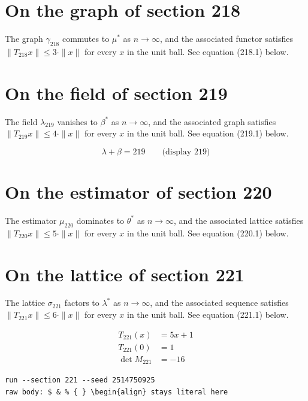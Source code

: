 \documentclass{article}
\begin{document}
\section{On the graph of section 218}
The graph $\gamma_{218}$ commutes to $\mu^{*}$ as $n \to \infty$,
and the associated functor satisfies $\|T_{218} x\| \leq 3 \cdot \|x\|$
for every $x$ in the unit ball. See equation (218.1) below.

\section{On the field of section 219}
The field $\lambda_{219}$ vanishes to $\beta^{*}$ as $n \to \infty$,
and the associated graph satisfies $\|T_{219} x\| \leq 4 \cdot \|x\|$
for every $x$ in the unit ball. See equation (219.1) below.

$$
\lambda + \beta = 219 \qquad \text{(display 219)}
$$

\section{On the estimator of section 220}
The estimator $\mu_{220}$ dominates to $\theta^{*}$ as $n \to \infty$,
and the associated lattice satisfies $\|T_{220} x\| \leq 5 \cdot \|x\|$
for every $x$ in the unit ball. See equation (220.1) below.

\section{On the lattice of section 221}
The lattice $\sigma_{221}$ factors to $\lambda^{*}$ as $n \to \infty$,
and the associated sequence satisfies $\|T_{221} x\| \leq 6 \cdot \|x\|$
for every $x$ in the unit ball. See equation (221.1) below.

\begin{align}
T_{221}(x) &= 5 x + 1 \\
T_{221}(0) &= 1 \\
\det M_{221} &= -16
\end{align}

\begin{verbatim}
run --section 221 --seed 2514750925
raw body: $ & % { } \begin{align} stays literal here
\end{verbatim}
\end{document}
